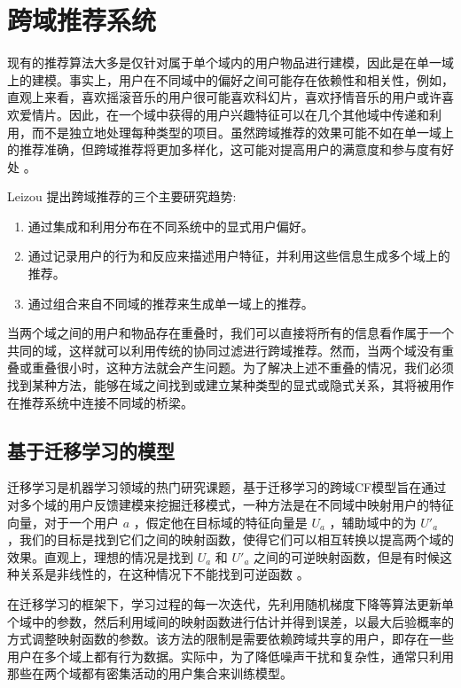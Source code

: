 \section{跨域推荐系统}
现有的推荐算法大多是仅针对属于单个域内的用户物品进行建模，因此是在单一域上的建模。事实上，用户在不同域中的偏好之间可能存在依赖性和相关性，例如，直观上来看，喜欢摇滚音乐的用户很可能喜欢科幻片，喜欢抒情音乐的用户或许喜欢爱情片。因此，在一个域中获得的用户兴趣特征可以在几个其他域中传递和利用，而不是独立地处理每种类型的项目。虽然跨域推荐的效果可能不如在单一域上的推荐准确，但跨域推荐将更加多样化，这可能对提高用户的满意度和参与度有好处 \cite{fernandez2012cross}。

Leizou \cite{Loizou2009How} 提出跨域推荐的三个主要研究趋势:
\begin{enumerate}
\item 通过集成和利用分布在不同系统中的显式用户偏好。
\item 通过记录用户的行为和反应来描述用户特征，并利用这些信息生成多个域上的推荐。
\item 通过组合来自不同域的推荐来生成单一域上的推荐。
\end{enumerate}

当两个域之间的用户和物品存在重叠时，我们可以直接将所有的信息看作属于一个共同的域，这样就可以利用传统的协同过滤进行跨域推荐。然而，当两个域没有重叠或重叠很小时，这种方法就会产生问题。为了解决上述不重叠的情况，我们必须找到某种方法，能够在域之间找到或建立某种类型的显式或隐式关系，其将被用作在推荐系统中连接不同域的桥梁\cite{fernandez2012cross}。

\subsection{基于迁移学习的模型}
迁移学习是机器学习领域的热门研究课题，基于迁移学习的跨域CF模型旨在通过对多个域的用户反馈建模来挖掘迁移模式，一种方法是在不同域中映射用户的特征向量，对于一个用户 $a$ ，假定他在目标域的特征向量是 $U_a$ ，辅助域中的为 $U'_a$ ，我们的目标是找到它们之间的映射函数，使得它们可以相互转换以提高两个域的效果。直观上，理想的情况是找到 $U_a$ 和 $U'_a$ 之间的可逆映射函数，但是有时候这种关系是非线性的，在这种情况下不能找到可逆函数 \cite{Xin2015Cross}。

在迁移学习的框架下，学习过程的每一次迭代，先利用随机梯度下降等算法更新单个域中的参数，然后利用域间的映射函数进行估计并得到误差，以最大后验概率的方式调整映射函数的参数。该方法的限制是需要依赖跨域共享的用户，即存在一些用户在多个域上都有行为数据。实际中，为了降低噪声干扰和复杂性，通常只利用那些在两个域都有密集活动的用户集合来训练模型。

